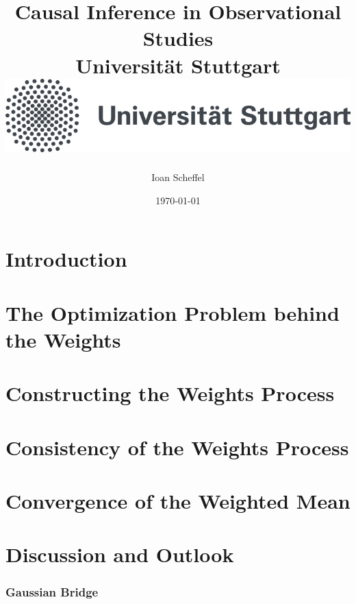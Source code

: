 \documentclass[11pt, a4paper, BCOR=10mm, DIV=11]{scrbook}
\title{
  {
    Causal Inference in Observational Studies
  }
  \\
  {\large Universität Stuttgart}
  \\
  {\includegraphics{unistuttgart_logo_deutsch.jpg}}
}
\author{Ioan Scheffel}
\date{\today}
\theoremstyle{definition}
\theoremstyle{plain}
\begin{document}
\maketitle

\tableofcontents 

\chapter{Introduction}
  
\chapter{The Optimization Problem behind the Weights}
  
\chapter{Constructing the Weights Process}
  
  
\chapter{Consistency of the Weights Process}
  

\chapter{Convergence of the Weighted Mean}
  
\chapter{Discussion and Outlook}
%  
%  
  \subsection*{Gaussian Bridge}
  
  
\end{document}
